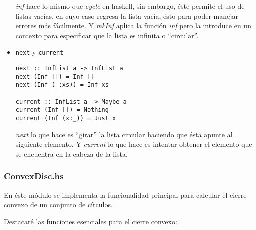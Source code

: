 \documentclass[12pt]{article}
\begin{document}
\begin{itemize}
  \textit{inf} hace lo mismo que \textit{cycle} en haskell, sin embargo, éste permite el uso de listas vacías, en cuyo caso regresa la lista vacía, ésto para poder manejar errores más fácilmente. Y \textit{mkInf} aplica la función \textit{inf} pero la introduce en un contexto para especificar que la lista es infinita o ``circular''.

\item \texttt{next} y \texttt{current}

  \begin{verbatim}
next :: InfList a -> InfList a
next (Inf []) = Inf []
next (Inf (_:xs)) = Inf xs

current :: InfList a -> Maybe a
current (Inf []) = Nothing
current (Inf (x:_)) = Just x
  \end{verbatim}
  
\textit{next} lo que hace es ``girar'' la lista circular haciendo que ésta apunte al siguiente elemento. Y \textit{current} lo que hace es intentar obtener el elemento que se encuentra en la cabeza de la lista.
  
\end{itemize}

\subsubsection*{ConvexDisc.hs}

En éste módulo se implementa la funcionalidad principal para calcular el cierre convexo de un conjunto de círculos.

Destacaré las funciones esenciales para el cierre convexo:
\end{document}

